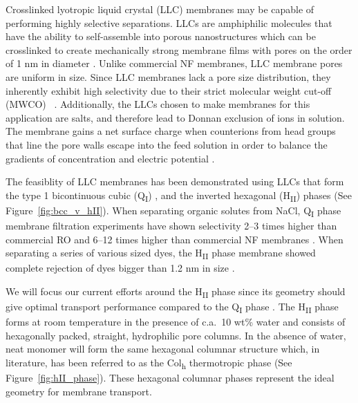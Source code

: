 \documentclass[journal=jpcbfk,manusciprt=article]{achemso}
\begin{document}
  Crosslinked lyotropic liquid crystal (LLC) membranes may be capable of
  performing highly selective separations. LLCs are amphiphilic molecules that
  have the ability to self-assemble into porous nanostructures
  \cite{smith_ordered_1997} which can be crosslinked to create mechanically
  strong membrane films with pores on the order of 1 nm in diameter
  \cite{zhou_supported_2005}. Unlike commercial NF membranes, LLC membrane pores
  are uniform in size. Since LLC membranes lack a pore size distribution, they
  inherently exhibit high selectivity due to their strict molecular weight
  cut-off (MWCO) ~\cite{zhou_supported_2005}. Additionally, the LLCs chosen to
  make membranes for this application are salts, and therefore lead to Donnan
  exclusion of ions in solution. The membrane gains a net surface charge when
  counterions from head groups that line the pore walls escape into the feed
  solution in order to balance the gradients of concentration and electric
  potential \cite{donnan_theory_1995}.    
 
  The feasiblity of LLC membranes has been demonstrated using LLCs that form
  the type 1 bicontinuous cubic (Q\textsubscript{I})
  \cite{hatakeyama_water_2011,hatakeyama_nanoporous_2010,carter_glycerol-based_2012},
  and the inverted hexagonal (H\textsubscript{II}) \cite{zhou_supported_2005}
  phases (See Figure~\ref{fig:bcc_v_hII}). When separating organic solutes from
  NaCl, Q\textsubscript{I} phase membrane filtration experiments have shown
  selectivity 2--3 times higher than commercial RO and 6--12 times higher than
  commercial NF membranes \cite{dischinger_application_2017}.  When separating a
  series of various sized dyes, the H\textsubscript{II} phase membrane showed
  complete rejection of dyes bigger than 1.2 nm in size
  \cite{zhou_supported_2005}. 

  We will focus our current efforts around the H\textsubscript{II} phase since
  its geometry should give optimal transport performance compared to the
  Q\textsubscript{I} phase \cite{matyka_tortuosity-porosity_2008}. The
  H\textsubscript{II} phase forms at room temperature in the presence of c.a.~10
  wt\% water and consists of hexagonally packed, straight, hydrophilic pore
  columns\cite{smith_ordered_1997}. In the absence of water, neat monomer will
  form the same hexagonal columnar structure which, in literature, has been
  referred to as the Col\textsubscript{h} thermotropic
  phase\cite{feng_scalable_2014} (See Figure~\ref{fig:hII_phase}).  These
  hexagonal columnar phases represent the ideal geometry for membrane transport. 
\end{document}
